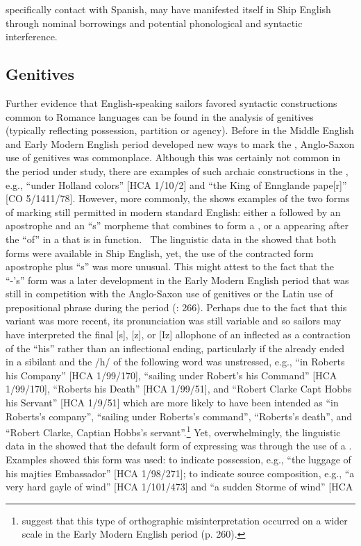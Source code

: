 specifically contact with Spanish, may have manifested itself in Ship English through nominal borrowings and potential phonological and syntactic interference. ~

\subsection{{Genitives}}\label{sec:5.2.2}

Further evidence that English-speaking sailors favored syntactic constructions common to Romance languages can be found in the analysis of genitives (typically reflecting possession, partition or agency). Before  in the Middle English and Early Modern English period developed new ways to mark the , Anglo-Saxon use of  genitives was commonplace. Although this was certainly not common in the period under study, there are examples of such archaic constructions in the , e.g., “under Holland colors” [HCA 1/10/2] and “the King of Ennglande pape[r]” [CO 5/1411/78]. However, more commonly, the  shows examples of the two forms of  marking still permitted in modern standard English: either a  followed by an apostrophe and an “s” morpheme that combines to form a  , or a  appearing after the  “of” in a  that is  in function. ~The linguistic data in the  showed that both forms were available in Ship English, yet, the use of the contracted form apostrophe plus “s” was more unusual. This might attest to the fact that the “-’s”  form was a later development in the Early Modern English period that was still in competition with the Anglo-Saxon use of  genitives or the Latin use of prepositional  phrase during the period (\citealt{MillwardHayes2012}: 266). Perhaps due to the fact that this variant was more recent, its pronunciation was still variable and so sailors may have interpreted the final [s], [z], or [Iz] allophone of an inflected   as a contraction of the   “his” rather than an inflectional ending, particularly if the  already ended in a sibilant and the /h/ of the following word was unstressed, e.g., “in Roberts his Company” [HCA 1/99/170], “sailing under Robert’s his Command” [HCA 1/99/170], “Roberts his Death” [HCA 1/99/51], and “Robert Clarke Capt Hobbs his Servant” [HCA 1/9/51] which are more likely to have been intended as “in Roberts’s company”, “sailing under Roberts’s command”, “Roberts’s death”, and “Robert Clarke, Captian Hobbs’s servant”.\footnote{\citealt{MillwardHayes2012} suggest that this type of orthographic misinterpretation occurred on a wider scale in the Early Modern English period (p. 260).} Yet, overwhelmingly, the linguistic data in the  showed that the default form of expressing  was through the use of a . Examples showed this form was used: to indicate possession, e.g., “the luggage of his majties Embassador” [HCA 1/98/271]; to indicate source composition, e.g., “a very hard gayle of wind” [HCA 1/101/473] and “a sudden Storme of wind” [HCA 